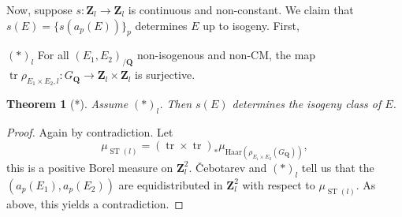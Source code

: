 \documentclass{article}
\DeclareMathOperator{\ST}{ST}
\DeclareMathOperator{\trace}{tr}
\newcommand{\bQ}{\mathbf{Q}}
\newcommand{\bZ}{\mathbf{Z}}
\newtheorem{theorem}{Theorem}
\numberwithin{theorem}{section}
\begin{document}
Now, suppose $s\colon \bZ_l\to \bZ_l$ is continuous and non-constant. We claim 
that $s(E) = \{s(a_p(E))\}_p$ determines $E$ up to isogeny. First, 

$(*)_l$ For all $(E_1,E_2)_{/\bQ}$ non-isogenous and non-CM, the map 
$\trace \rho_{E_1\times E_2,l}\colon G_\bQ\to \bZ_l\times \bZ_l$ is surjective. 

\begin{theorem}[*]
Assume $(\ast)_l$. Then $s(E)$ determines the isogeny class of $E$. 
\end{theorem}
\begin{proof}
Again by contradiction. Let 
\[
	\mu_{\ST(l)} = (\trace\times\trace)_\ast \mu_{\mathrm{Haar}(\rho_{E_1\times E_2}(G_\bQ))} ,
\]
this is a positive Borel measure on $\bZ_l^2$. \v{C}ebotarev and $(\ast)_l$ 
tell us that the $(a_p(E_1),a_p(E_2))$ are equidistributed in 
$\bZ_l^2$ with respect to $\mu_{\ST(l)}$. As above, this yields a 
contradiction. 
\end{proof}
\end{document}
